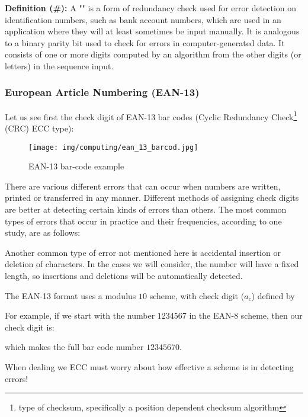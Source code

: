 	\textbf{Definition (\#\mydef):} A "" is a form of redundancy check used for error detection on identification numbers, such as bank account numbers, which are used in an application where they will at least sometimes be input manually. It is analogous to a binary parity bit used to check for errors in computer-generated data. It consists of one or more digits computed by an algorithm from the other digits (or letters) in the sequence input.
	
	\subsubsection{European Article Numbering (EAN-13)}
	Let us see first the check digit of EAN-13 bar codes (Cyclic Redundancy Check\footnote{type of checksum, specifically a position dependent checksum algorithm} (CRC) ECC type):
	\begin{figure}[H]
		\centering
		\texttt{[image: img/computing/ean\_13\_barcod.jpg]}
		\caption{EAN-13 bar-code example}
	\end{figure}
	There are various different errors that can occur when numbers are written, printed or transferred in any manner. Different methods of assigning check digits are better at detecting certain kinds of errors than others. The most common types of errors that occur in practice and their frequencies, according to one study, are as follows:
	
	Another common type of error not mentioned here is accidental insertion or deletion of characters. In the cases we will consider, the number will have a fixed length, so insertions and deletions will be automatically detected.
	
	The EAN-13 format uses a modulus $10$ scheme, with check digit ($a_ c$) defined by
	
	For example, if we start with the number $1234567$ in the EAN-8 scheme, then our check digit is:
	
	which makes the full bar code number $12345670$.
	
	When dealing we ECC must worry about how effective a scheme is in detecting errors!
	
